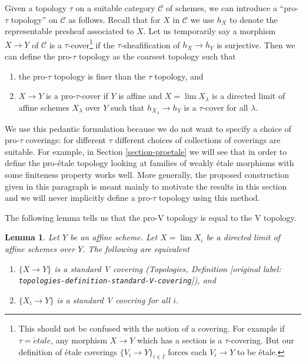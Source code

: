 \documentclass[10pt,a4paper]{article}
\theoremstyle{plain}
\newtheorem{lemma}[subsection]{Lemma}
\theoremstyle{definition}
\theoremstyle{remark}
\numberwithin{equation}{subsection}
\def\lim{\mathop{\mathrm{lim}}\nolimits}
\def\etale{{\acute{e}tale}}
\begin{document}
\medskip\noindent
Given a topology $\tau$ on a suitable category $\mathcal{C}$
of schemes, we can introduce a ``pro-$\tau$ topology''
on $\mathcal{C}$ as follows. Recall that for $X$ in $\mathcal{C}$
we use $h_X$ to denote the representable presheaf associated to $X$.
Let us temporarily say a morphism $X \to Y$ of $\mathcal{C}$
is a $\tau$-cover\footnote{This should not be confused with
the notion of a covering. For example if $\tau = \etale$,
any morphism $X \to Y$ which has a section is a $\tau$-covering. But our
definition of \'etale coverings $\{V_i \to Y\}_{i \in I}$
forces each $V_i \to Y$ to be \'etale.}
if the $\tau$-sheafification of $h_X \to h_Y$
is surjective. Then we can define the pro-$\tau$ topology
as the coarsest topology such that
\begin{enumerate}
\item the pro-$\tau$ topology is finer than the $\tau$ topology, and
\item $X \to Y$ is a pro-$\tau$-cover if
$Y$ is affine and $X = \lim X_\lambda$ is a directed
limit of affine schemes $X_\lambda$ over $Y$ such that
$h_{X_\lambda} \to h_Y$ is a $\tau$-cover for all $\lambda$.
\end{enumerate}
We use this pedantic formulation because we do not want to
specify a choice of pro-$\tau$ coverings: for different $\tau$
different choices of collections of coverings are suitable.
For example, in Section \ref{section-proetale} we will see that
in order to define the pro-\'etale topology looking at families
of weakly \'etale morphisms with some finiteness property works well.
More generally, the proposed construction given in this paragraph is
meant mainly to motivate the results in this section and we will never
implicitly define a pro-$\tau$ topology using this method.

\medskip\noindent
The following lemma tells us that the
pro-V topology is equal to the V topology.

\begin{lemma}
\label{lemma-pro-V-V}
Let $Y$ be an affine scheme. Let $X = \lim X_i$ be a directed limit
of affine schemes over $Y$. The following are equivalent
\begin{enumerate}
\item $\{X \to Y\}$ is a standard V covering
(Topologies, Definition \textnormal{[original label: \nolinkurl{topologies-definition-standard-V-covering}]}), and
\item $\{X_i \to Y\}$ is a standard V covering for all $i$.
\end{enumerate}
\end{lemma}
\end{document}
